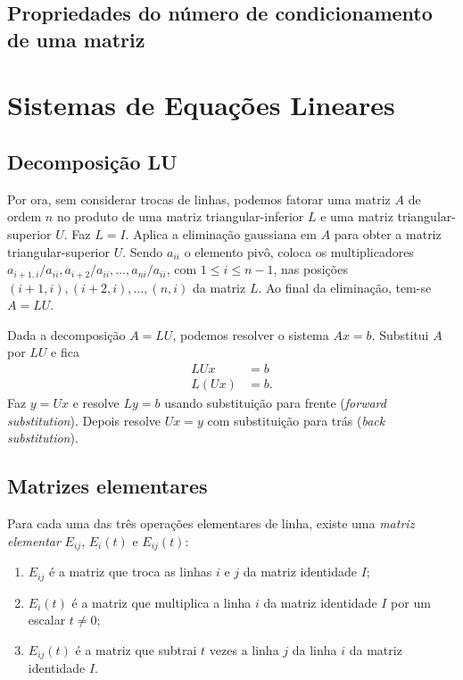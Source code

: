 \documentclass{article}
\begin{document}
\subsection{Propriedades do número de condicionamento de uma matriz}

\section{Sistemas de Equações Lineares}

\subsection{Decomposição LU}

Por ora, sem considerar trocas de linhas, podemos fatorar uma matriz \(A\) de ordem \(n\) no produto de uma matriz triangular-inferior \(L\) e uma matriz triangular-superior \(U\). Faz \(L=I\). Aplica a eliminação gaussiana em \(A\) para obter a matriz triangular-superior \(U\). Sendo \(a_{ii}\) o elemento pivô, coloca os multiplicadores \(a_{i+1,i}/a_{ii},a_{i+2}/a_{ii},\ldots,a_{ni}/a_{ii}\), com \(1\leq i \leq n-1\), nas posições \((i+1,i),(i+2,i),\ldots,(n,i)\) da matriz \(L\). Ao final da eliminação, tem-se \(A=LU\).

Dada a decomposição \(A=LU\), podemos resolver o sistema \(Ax=b\). Substitui \(A\) por \(LU\) e fica
\begin{align}
    LUx&=b\\
    L(Ux)&=b.
\end{align}
Faz \(y=Ux\) e resolve \(Ly=b\) usando substituição para frente (\emph{forward substitution}). Depois resolve \(Ux=y\) com substituição para trás (\emph{back substitution}).

\subsection{Matrizes elementares}

\begin{defn}
    Para cada uma das três operações elementares de linha, existe uma \emph{matriz elementar} \(E_{ij}\), \(E_{i}(t)\) e \(E_{ij}(t)\):
    \begin{enumerate}
        \item \(E_{ij}\) é a matriz que troca as linhas \(i\) e \(j\) da matriz identidade \(I\);
        \item \(E_i(t)\) é a matriz que multiplica a linha \(i\) da matriz identidade \(I\) por um escalar \(t \neq 0\);
        \item \(E_{ij}(t)\) é a matriz que subtrai \(t\) vezes a linha \(j\) da linha \(i\) da matriz identidade \(I\).
    \end{enumerate}
\end{defn}
\end{document}
